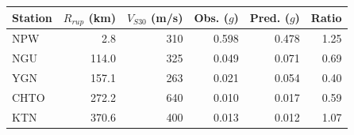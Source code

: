\begin{tabular}{@{}lrrrrr@{}}
\toprule
Station & $R_{rup}$ (km) & $V_{S30}$ (m/s) & Obs. ($g$) & Pred. ($g$) & Ratio \\
\midrule
NPW & 2.8 & 310 & 0.598 & 0.478 & 1.25 \\
NGU & 114.0 & 325 & 0.049 & 0.071 & 0.69 \\
YGN & 157.1 & 263 & 0.021 & 0.054 & 0.40 \\
CHTO & 272.2 & 640 & 0.010 & 0.017 & 0.59 \\
KTN & 370.6 & 400 & 0.013 & 0.012 & 1.07 \\
\bottomrule
\end{tabular}
